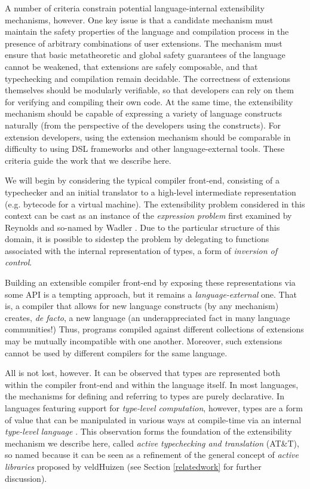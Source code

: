 \documentclass[10pt]{sigplanconf}
\begin{document}
A number of criteria constrain potential language-internal extensibility mechanisms, however. One key issue is that a candidate mechanism must maintain the safety properties of the language and compilation process in the presence of arbitrary combinations of user extensions. The mechanism must ensure that basic metatheoretic and global safety guarantees of the language cannot be weakened, that extensions are safely composable, and that typechecking and compilation remain decidable. The correctness of extensions themselves should be modularly verifiable, so that developers can rely on them for verifying and compiling their own code. At the same time, the extensibility mechanism should be capable of expressing a variety of language constructs naturally (from the perspective of the developers using the constructs). For extension developers, using the extension mechanism should be comparable in difficulty to using DSL frameworks and other language-external tools. These criteria guide the work that we describe here.

We will begin by considering the typical compiler front-end, consisting of a typechecker and an initial translator to a high-level intermediate representation (e.g. bytecode for a virtual machine). The extensibility problem considered in this context can be cast as an instance of the \emph{expression problem} first examined by Reynolds \cite{reynoldsexpressionproblem} and so-named by Wadler \cite{expressionproblem}. Due to the particular structure of this domain, it is possible to sidestep the problem by delegating to functions associated with the internal representation of types, a form of \emph{inversion of control}.

Building an extensible compiler front-end by exposing these representations via some API is a tempting approach, but it remains a  \emph{language-external} one. That is, a compiler that allows for new language constructs (by any mechanism) creates, \emph{de facto}, a new language (an underappreciated fact in many language communities!)  Thus, programs compiled against different collections of extensions may be mutually incompatible with one another. Moreover, such extensions cannot be used by different compilers for the same language.

All is not lost, however. It can be observed that types are represented both within the compiler front-end and within the language itself. In most languages, the mechanisms for defining and referring to types are purely declarative. In languages featuring support for \emph{type-level computation}, however, types are a form of value that can be manipulated in various ways at compile-time via an internal \emph{type-level language} \cite{tlc}. This observation forms the foundation of the extensibility mechanism we describe here, called \emph{active typechecking and translation} (AT\&T), so named because it can be seen as a refinement of the general concept of \emph{active libraries}  proposed by veldHuizen \cite{activelibraries} (see Section \ref{relatedwork} for further discussion).
\end{document}
